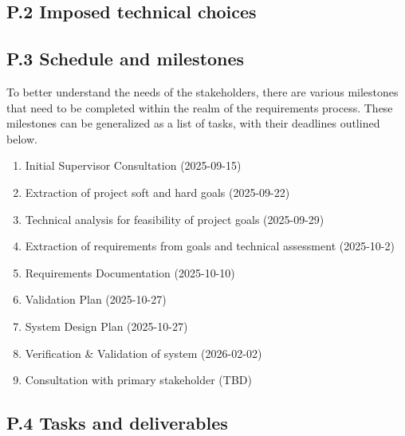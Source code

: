 \documentclass[12pt]{article}
\theoremstyle{definition}
\begin{document}
\subsection{P.2 Imposed technical choices}

\subsection{P.3 Schedule and milestones} \label{item: p3}   

To better understand the needs of the stakeholders, there are various milestones
 that need to be completed within the realm of the requirements process.
These milestones can be generalized as a list of tasks, with their deadlines 
outlined below.

\begin{enumerate}
  \item Initial Supervisor Consultation (2025-09-15) \label{item: p3-1}
  \item Extraction of project soft and hard goals (2025-09-22) 
  \label{item: p3-2}
  \item Technical analysis for feasibility of project goals (2025-09-29) 
  \label{item: p3-3}
  \item Extraction of requirements from goals and technical assessment 
  (2025-10-2) \label{item: p3-4}
  \item Requirements Documentation (2025-10-10) \label{item: p3-5}
  \item Validation Plan (2025-10-27) \label{item: p3-6}
  \item System Design Plan (2025-10-27) \label{item: p3-7}
  \item Verification \& Validation of system (2026-02-02) \label{item: p3-8}
  \item Consultation with primary stakeholder (TBD) \label{item: p3-9}
\end{enumerate}

\subsection{P.4 Tasks and deliverables}
\end{document}
